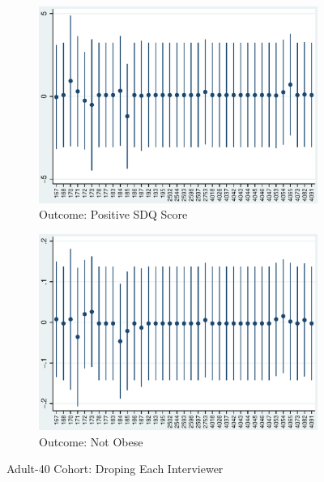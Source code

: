     \begin{figure}[H]
      \centering
        \begin{subfigure}[t]{0.81\textwidth}
          \includegraphics[width=\textwidth]{../../../output/image/coef-interviewer-adult40-votoMaturita.eps}       
\caption{Outcome: Positive SDQ Score}        
        \end{subfigure}
        \begin{subfigure}[t]{0.81\textwidth}
          \includegraphics[width=\textwidth]{../../../output/image/coef-interviewer-adult40-BMI_obese.eps}       
 \caption{Outcome: Not Obese}        
        \end{subfigure}
      \caption{Adult-40 Cohort: Droping Each Interviewer}  \label{fig:adult40-sensitivity-interviewer}
    \end{figure}







